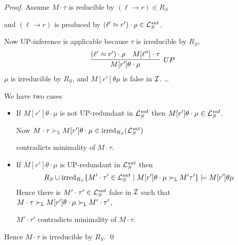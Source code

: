        \begin{proof}
            Assume \( M\cdot\tau \) is reducible by \( (\ell\to r)\in R_S \)

            and \( (\ell\to r) \) is produced by \( (\ell'\approx r')\cdot\rho\in\mathcal{L}_S^{sat} \).

           \vspace{0.7em}
            Now UP-inference is applicable because \( \tau \) is irreducible by \( R_S \),
           \begin{gather*}
               \infer[UP]
                {M[r']\theta\cdot\mu}
                {(\ell'\mEQ r')\cdot\rho & M[\ell'']\cdot\tau}
           \end{gather*}
           \( \mu \) is irreducible by \( R_S \), and \( M[r']\theta\mu \){ is false in }\( \mathcal{I} \).
           \hfill\ldots

        We have two cases

           \begin{itemize}
               \item If \( M[r']\theta\cdot\mu \) is not UP-redundant in \( \mathcal{L}_S^{sat} \)
                then \( M[r']\theta\cdot\mu\in\mathcal{L}_S^{sat} \).

               \vspace{0.3em}
                Now \( M\cdot\tau\mathrel\succ_{\mathtt{L}}
                M[r']\theta\cdot\mu\in \operatorname{irred}_{R_S}(\mathcal{L}_S^{sat}) \)

                contradicts minimality of \( M\cdot\tau \).
               \hfill
               \vspace{0.3em}

               \item If \( M[r']\theta\cdot\mu \) is UP-redundant in \( \mathcal{L}_S^{sat} \) then
               \vspace{-0.3em}
               \begin{gather*}
                    R_S \cup \operatorname{irred}_{R_S}
                   \{
                        M'\cdot\tau'\in\mathcal{L}_S^{sat}\mid
                        M[r']\theta\cdot\mu \mathrel\succ_{\mathtt{L}} M'\tau'
                       \} \models M[r']\theta\mu
               \end{gather*}
                Hence there is \( M'\cdot\tau'\in\mathcal{L}_S^{sat} \) false in \( \mathcal{I} \) such that
               \( M\cdot\tau\mathrel\succ_{\mathtt{L}} M[r']\theta\cdot\mu\mathrel\succ_{\mathtt{L}} M'\cdot\tau' \),

               \( M'\cdot\tau' \) contradicts minimality of \( M\cdot\tau \).
               \hfill

           \end{itemize}

            Hence \( M\cdot\tau \) is irreducible by \( R_S \).
           \hfill\qed{}
       \end{proof}





